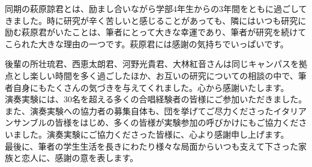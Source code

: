 \documentclass[11pt,a4j,dvipdfmx, twoside]{jreport}
\begin{document}
同期の萩原諒君とは、励まし合いながら学部4年生からの3年間をともに過ごしてきました。時に研究が辛く苦しいと感じることがあっても、隣にはいつも研究に励む萩原君がいたことは、筆者にとって大きな幸運であり、筆者が研究を続けてこられた大きな理由の一つです。萩原君には感謝の気持ちでいっぱいです。

後輩の所壮琉君、西恵太朗君、河野光貴君、大林紅音さんは同じキャンパスを拠点とし楽しい時間を多く過ごしたほか、お互いの研究についての相談の中で、筆者自身にもたくさんの気づきを与えてくれました。心から感謝いたします。
\\

演奏実験には、30名を超える多くの合唱経験者の皆様にご参加いただきました。また、演奏実験への協力者の募集自体も、団を挙げてご尽力くださったイタリアンサンブルの皆様をはじめ、多くの皆様が実験参加の呼びかけにもご協力くださいました。演奏実験にご協力くださった皆様に、心より感謝申し上げます。
\\

最後に、筆者の学生生活を長きにわたり様々な局面からいつも支えて下さった家族と恋人に、感謝の意を表します。
\\

\clearpage
\end{document}
